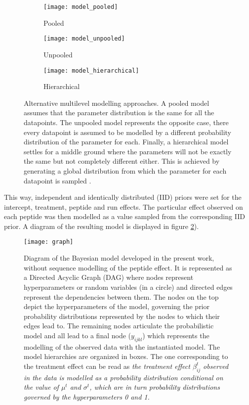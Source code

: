 \begin{figure}[H]
\centering
\begin{subfigure}{.9\textwidth}
\centering
\caption*{Pooled}
\texttt{[image: model\_pooled]}
\end{subfigure}
\bigskip
\begin{subfigure}{.9\textwidth}
\centering
\caption*{Unpooled}
\texttt{[image: model\_unpooled]}
\end{subfigure}
\bigskip
\begin{subfigure}{.9\textwidth}
\centering
\caption*{Hierarchical}
\texttt{[image: model\_hierarchical]}
\end{subfigure}
\caption[]{Alternative multilevel modelling approaches. A pooled model assumes that the parameter distribution is the same for all the datapoints.  The unpooled model represents the opposite case, there every datapoint is assumed to be modelled by a different probability distribution of the parameter for each. Finally, a hierarchical model settles for a middle ground where the parameters will not be exactly the same but not completely different either. This is achieved by generating a global distribution from which the parameter for each datapoint is sampled \footnotemark{}.}
\label{fig:multilevel}
\end{figure}



This way, independent and identically distributed (\ac{IID}) priors were set for the intercept, treatment, peptide and run effects. The particular effect observed on each peptide was then modelled as a value sampled from the corresponding \ac{IID} prior. A diagram of the resulting model is displayed in figure \ref{fig:daft_model}).

\begin{figure}[!h]
\centering
\texttt{[image: graph]}
\caption[Bayesian model simplified diagram]{Diagram of the Bayesian model developed in the present work, without sequence modelling of the peptide effect. It is represented as a Directed Acyclic Graph (\ac{DAG}) where nodes represent hyperparameters or random variables (in a circle) and directed edges  represent the dependencies between them. The nodes on the top depict the hyperparameters of the model, governing the prior probability distributions represented by the nodes to which their edges lead to. The remaining nodes articulate the probabilistic model and all lead to a final node ($y_{ijkl}$) which represents the modelling of the observed data with the instantiated model. The model hierarchies are organized in boxes. The one corresponding to the treatment effect can be read as \textit{the treatment effect $\beta_{ij}^{t}$ observed in the data is modelled as a probability distribution conditional on the value of $\mu^t$ and $\sigma^t$, which are in turn probability distributions governed by the hyperparameters 0 and 1.}}
\label{fig:daft_model}
\end{figure}

